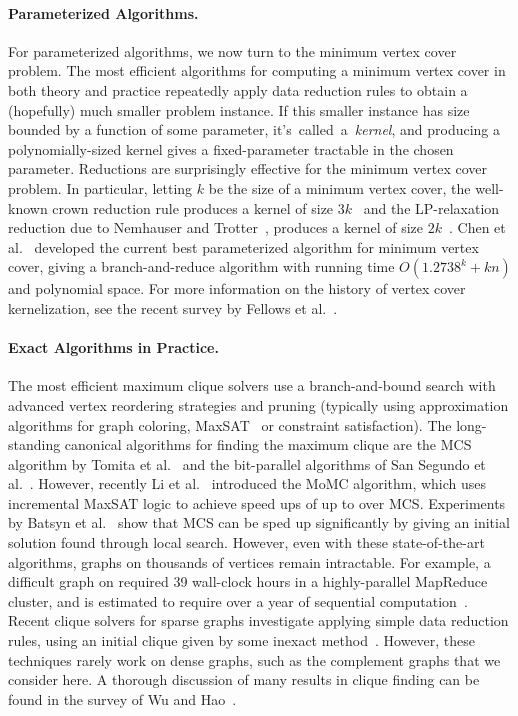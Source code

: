 \documentclass[twoside,leqno,twocolumn]{article}
\begin{document}
\paragraph*{Parameterized Algorithms.}
For parameterized algorithms, we now turn to the minimum vertex cover problem. The most efficient algorithms for computing a minimum vertex cover in both theory and practice repeatedly apply data reduction rules to obtain a (hopefully) much smaller problem instance. If this smaller instance has size bounded by a function of some parameter, it's~called~a~\emph{kernel}, and producing a polynomially-sized kernel gives a fixed-parameter tractable in the chosen parameter. Reductions are surprisingly effective for the minimum vertex cover problem. In particular, letting $k$ be the size of a minimum vertex cover, the well-known crown reduction rule produces a kernel of size $3k$~\cite{chor2005linear} and the LP-relaxation reduction due to Nemhauser and Trotter~\cite{nemhauser-1975}, produces a kernel of size $2k$~\cite{chen1999}. Chen et al.~\cite{chen2010improved} developed the current best parameterized algorithm for minimum vertex cover, giving a branch-and-reduce algorithm with running time $O(1.2738^k +kn)$ and polynomial space.
For more information on the history of vertex cover kernelization, see the recent survey by Fellows et al.~\cite{fellows2018known}.

\paragraph*{Exact Algorithms in Practice.}
The most efficient maximum clique solvers use a branch-and-bound search with advanced vertex reordering strategies and pruning (typically using approximation algorithms for graph coloring, MaxSAT~\cite{li-maxsat-2013} or constraint satisfaction). The long-standing canonical algorithms for finding the maximum clique are the MCS algorithm by Tomita et al.~\cite{tomita-recoloring} and the bit-parallel algorithms of San Segundo et al.~\cite{segundo-recoloring,segundo-bitboard-2011}. However, recently Li et al.~\cite{DBLP:journals/cor/LiJM17} introduced the MoMC algorithm, which uses incremental MaxSAT logic to achieve speed ups of up to  over MCS. Experiments by Batsyn et al.~\cite{batsyn-mcs-ils-2014} show that MCS can be sped up significantly by giving an initial solution found through local search. However, even with these state-of-the-art algorithms, graphs on thousands of vertices remain intractable. For example, a difficult graph on  required 39 wall-clock hours in a highly-parallel MapReduce cluster, and is estimated to require over a year of sequential computation~\cite{xiang-2013}. Recent clique solvers for sparse graphs investigate applying simple data reduction rules, using an initial clique given by some inexact method~\cite{verma2015solving,sansegundo2016a,chang2019efficient}. However, these techniques rarely work on dense graphs, such as the complement graphs that we consider here.
A thorough discussion of many results in clique finding can be found in the survey of Wu and Hao~\cite{wu-hao-2015}.
\end{document}
